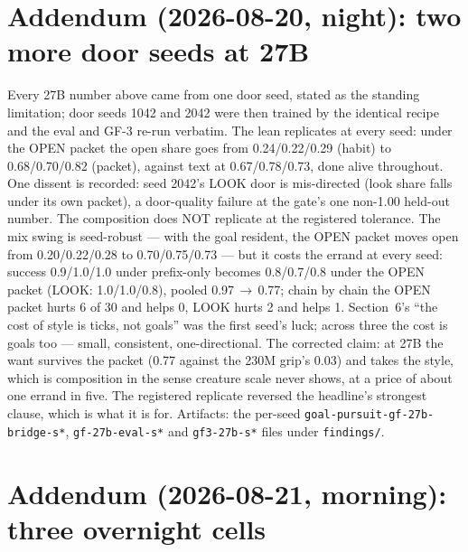 \documentclass[11pt]{article}
\begin{document}
\section*{Addendum (2026-08-20, night): two more door seeds at 27B}

Every 27B number above came from one door seed, stated as the
standing limitation; door seeds 1042 and 2042 were then trained by
the identical recipe and the eval and GF-3 re-run verbatim. The lean
replicates at every seed: under the OPEN packet the open share goes
from 0.24/0.22/0.29 (habit) to 0.68/0.70/0.82 (packet),
against text at 0.67/0.78/0.73, done alive throughout. One dissent is recorded:
seed 2042's LOOK door is mis-directed (look share falls under its own
packet), a door-quality failure at the gate's one non-1.00 held-out
number. The composition does NOT replicate at the registered
tolerance. The mix swing is seed-robust --- with the goal resident,
the OPEN packet moves open from 0.20/0.22/0.28 to
0.70/0.75/0.73 --- but it costs the errand at every seed:
success 0.9/1.0/1.0 under prefix-only becomes 0.8/0.7/0.8
under the OPEN packet (LOOK: 1.0/1.0/0.8), pooled
0.97\,$\to$\,0.77; chain by chain the OPEN
packet hurts 6 of 30 and helps 0, LOOK hurts
2 and helps 1. Section~6's ``the cost of
style is ticks, not goals'' was the first seed's luck; across three
the cost is goals too --- small, consistent, one-directional. The
corrected claim: at 27B the want survives the packet
(0.77 against the 230M grip's 0.03) and takes the style,
which is composition in the sense creature scale never shows, at a
price of about one errand in five. The registered replicate reversed
the headline's strongest clause, which is what it is for. Artifacts: the per-seed
\texttt{goal-pursuit-gf-27b-bridge-s*}, \texttt{gf-27b-eval-s*} and
\texttt{gf3-27b-s*} files under \texttt{findings/}.

\section*{Addendum (2026-08-21, morning): three overnight cells}
\end{document}
